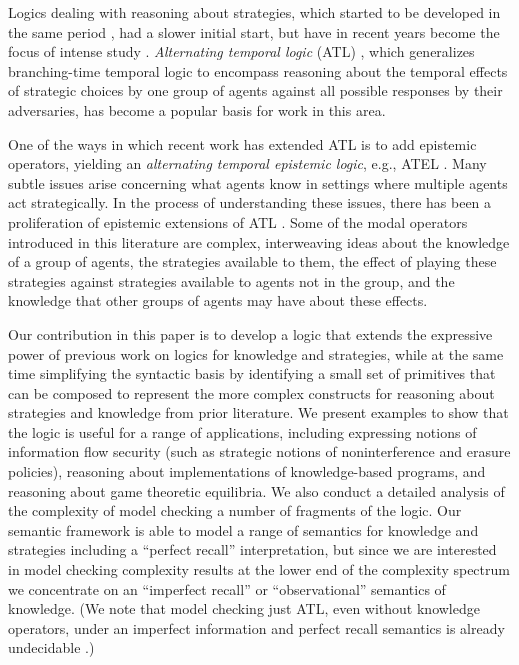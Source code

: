 \documentclass[a4wide]{article}
\theoremstyle{examplesty}
\begin{document}
Logics dealing with  reasoning about strategies, which started to be developed in the same period \cite{Parikh83}, 
had a slower initial start, but have in recent years become the focus of intense study \cite{Pauly2002,Horty2001,ATLJACM}. 
 {\em Alternating temporal logic} (ATL) \cite{ATLJACM}, which generalizes branching-time 
temporal logic to encompass reasoning about the temporal effects of strategic choices by one group of agents against
all possible responses by their adversaries,  has become a popular basis for work in this area. 

One of the ways in which recent work has extended ATL is to add epistemic operators, yielding an 
{\em alternating temporal 
epistemic logic}, 
e.g., ATEL \cite{ATEL}. 
Many subtle issues  arise concerning  what agents know in  settings 
where multiple agents act strategically. In the process of understanding these issues, there has been a proliferation 
of epistemic extensions of ATL
\cite{Jonker2003,
vOJ2005,Jamroga2003,JA07}.  
Some of the modal operators introduced in this literature are complex, interweaving ideas about the 
knowledge of a group of agents, the strategies available to them,  the effect of playing these strategies 
against strategies available to agents not in the group, 
and the knowledge that other groups of agents may have about these effects. 

Our contribution in this paper is to develop a logic that extends the expressive power
of previous work on logics for knowledge and strategies, while at the same time 
simplifying the syntactic basis by 
identifying a 
small 
set of primitives 
that can be composed to represent the more complex 
constructs for reasoning about 
strategies and knowledge
from prior literature.  
We present examples to show that the logic is useful for a range of
applications, including expressing notions of information
flow security (such as strategic notions of noninterference
and erasure policies), reasoning about implementations of knowledge-based programs, 
and reasoning about game theoretic equilibria. 
We also conduct a detailed analysis of the complexity of model checking a number of 
fragments of the logic. 
Our semantic framework is able to model a range of semantics for knowledge and strategies 
including a ``perfect recall'' interpretation, but since we are interested in model checking complexity
results at the lower end of the complexity spectrum we concentrate on an ``imperfect recall'' or 
``observational'' semantics of knowledge.  (We note that model checking just ATL, even without 
knowledge operators, under an imperfect information and perfect recall semantics is already 
undecidable \cite{DimaATLpr}.)
\end{document}
